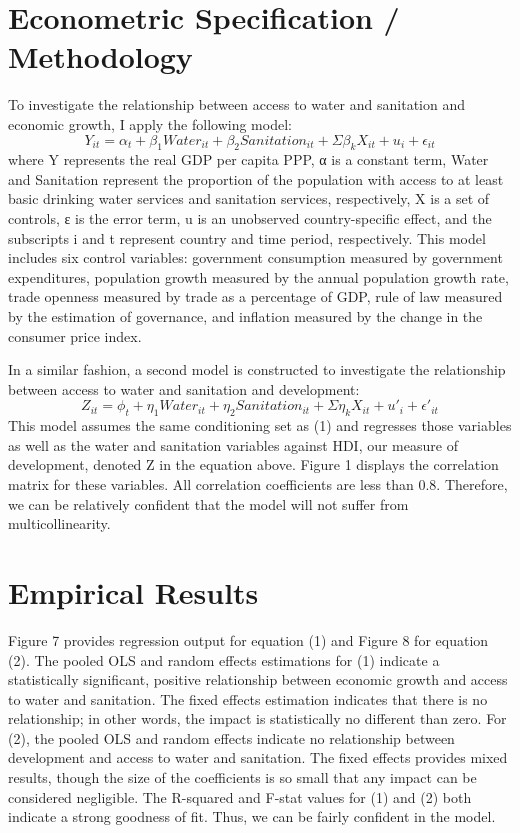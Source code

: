 \documentclass{article}
\begin{document}
\section{Econometric Specification / Methodology}
To investigate the relationship between access to water and sanitation and economic growth, I apply the following model: 
\begin{equation}
	Y_{it} = \alpha_{t} + \beta_{1} Water_{it} + \beta_{2} Sanitation_{it} + \Sigma \beta_{k}X_{it} + {u_i} + \epsilon_{it}
\end{equation}
where Y represents the real GDP per capita PPP, α is a constant term, Water and Sanitation represent the proportion of the population with access to at least basic drinking water services and sanitation services, respectively, X is a set of controls, ε is the error term, u is an unobserved country-specific effect, and the subscripts i and t represent country and time period, respectively. This model includes six control variables: government consumption measured by government expenditures, population growth measured by the annual population growth rate, trade openness measured by trade as a percentage of GDP, rule of law measured by the estimation of governance, and inflation measured by the change in the consumer price index. 


In a similar fashion, a second model is constructed to investigate the relationship between access to water and sanitation and development: 
\begin{equation}
	Z_{it} = \phi_{t} + \eta_{1} Water_{it} + \eta_{2} Sanitation_{it} + \Sigma \eta_{k}X_{it} + {u'_i} + \epsilon'_{it}
\end{equation}
This model assumes the same conditioning set as (1) and regresses those variables as well as the water and sanitation variables against HDI, our measure of development, denoted Z in the equation above. Figure 1 displays the correlation matrix for these variables. All correlation coefficients are less than 0.8. Therefore, we can be relatively confident that the model will not suffer from multicollinearity. 

\section{Empirical Results}
Figure 7 provides regression output for equation (1) and Figure 8 for equation (2). The pooled OLS and random effects estimations for (1) indicate a statistically significant, positive relationship between economic growth and access to water and sanitation. The fixed effects estimation indicates that there is no relationship; in other words, the impact is statistically no different than zero. For (2), the pooled OLS and random effects indicate no relationship between development and access to water and sanitation. The fixed effects provides mixed results, though the size of the coefficients is so small that any impact can be considered negligible. The R-squared and F-stat values for (1) and (2) both indicate a strong goodness of fit. Thus, we can be fairly confident in the model. 
\end{document}
